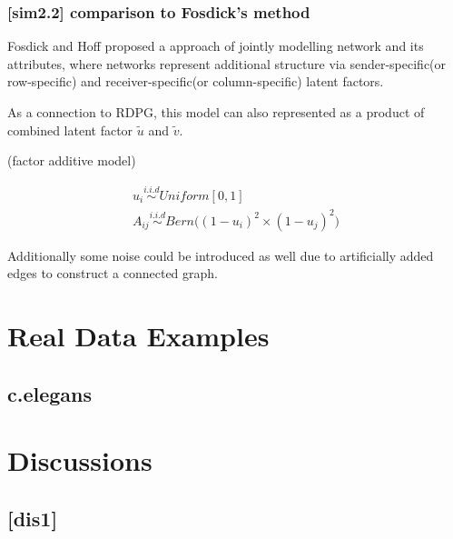 \documentclass[12pt]{article}
\theoremstyle{definition}
\begin{document}
\subsubsection{[sim2.2] comparison to Fosdick's method}


Fosdick and Hoff proposed a approach of jointly modelling network and its attributes, where networks represent additional structure via sender-specific(or row-specific) and receiver-specific(or column-specific) latent factors.

As a connection to RDPG, this model can also represented as a product of combined latent factor $\tilde{u}$ and $\tilde{v}$. 

(factor additive model)

\begin{equation}
\begin{gathered}
u_{i} \overset{i.i.d}{\sim} Uniform[0,1] \\ 
A_{ij}  \overset{i.i.d}{\sim} Bern \big(  ( 1 - u_{i})^2 \times (1 - u_{j})^2    \big)
\end{gathered}
\end{equation}



Additionally some noise could be introduced as well due to artificially added edges to construct a connected graph.






\newpage
\section{Real Data Examples}
\label{sec:real}

\subsection{c.elegans}




\newpage
\section{Discussions}
\label{sec:discussion}



\subsection{[dis1]}
\end{document}
